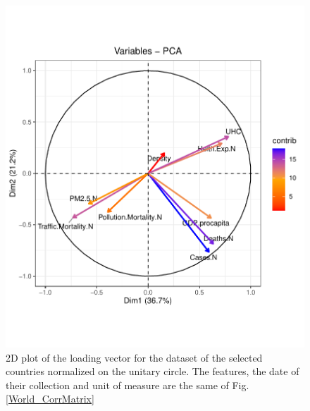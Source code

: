 \documentclass[
12pt, %
a4paper, %
oneside, %
headinclude,footinclude, %
BCOR5mm, %
]{scrartcl}
\begin{document}
\begin{figure}[h]
\begin{center}
\includegraphics[scale=1]{Pic/PCA-Loadings_WORLD.pdf}
\caption{2D plot of the loading vector for the dataset of the selected countries normalized on the unitary circle. The features, the date of their collection and unit of measure are the same of Fig. \ref{World_CorrMatrix}}
\label{World_PCA_loadings}
\end{center}
\end{figure}
\end{document}
